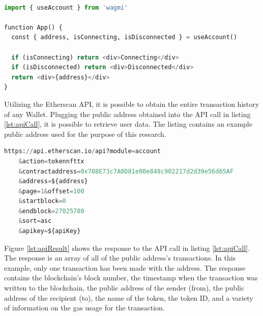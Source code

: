 \begin{center}
\begin{lstlisting}[label=lst:wagmi ,language=python, caption=An example of getting a wallet's public address using \textit{wagmi React Hooks for Ethereum} \cite{wagmi}. This can be used once the wallet has been connected successfully., captionpos=b]

import { useAccount } from 'wagmi'
 
function App() {
  const { address, isConnecting, isDisconnected } = useAccount()
 
  if (isConnecting) return <div>Connecting</div>
  if (isDisconnected) return <div>Disconnected</div>
  return <div>{address}</div>
}

\end{lstlisting}
\end{center}

Utilizing the Etherscan API, it is possible to obtain the entire transaction history of any Wallet. Plugging the public address obtained into the API call in listing \ref{lst:apiCall}, it is possible to retrieve user data. The listing contains an example public address used for the purpose of this research.

\begin{center}
\begin{lstlisting}[label=lst:apiCall ,language=python, caption=A real-world example API call made from the frontend in order to retrieve all of a user's transactional data. The API is provided by \textit{Etherscan} \cite{etherscan}., captionpos=b]
https://api.etherscan.io/api?module=account
    &action=tokennfttx
    &contractaddress=0x708E73c7A0D81e00e848c902217d2d39e56d65AF
    &address=${address}
    &page=1&offset=100
    &startblock=0
    &endblock=27025780
    &sort=asc
	&apikey=${apiKey}
\end{lstlisting}
\end{center}

Figure \ref{lst:apiResult} shows the response to the API call in listing \ref{lst:apiCall}. The response is an array of all of the public address's transactions. In this example, only one transaction has been made with the address. The response contains the blockchain's block number, the timestamp when the transaction was written to the blockchain, the public address of the sender (from), the public address of the recipient (to), the name of the token, the token ID, and a variety of information on the gas usage for the transaction.


